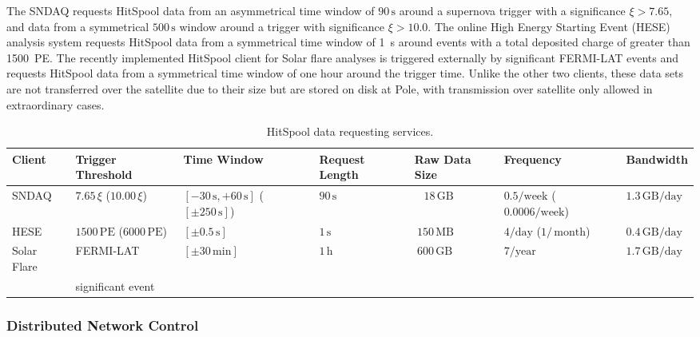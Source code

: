The SNDAQ requests HitSpool data from an asymmetrical
time window of $90 \,\mathrm{s}$ around a
supernova trigger with a significance $\xi > 7.65$, and
data from a symmetrical
$500\,\mathrm{s}$ window around a trigger with significance $\xi
> 10.0$. The online High Energy Starting Event
(HESE) analysis system requests HitSpool data from a
symmetrical time window of 1~s around events with a total deposited
charge of greater than 1500~PE.
The recently implemented HitSpool client for Solar flare analyses is
triggered externally by significant FERMI-LAT events and requests
HitSpool data from a
symmetrical time window of one hour around the trigger
time. Unlike the other two clients, these data sets
are not transferred over the satellite due to their size but are stored on
disk at Pole, with transmission over satellite only allowed in
extraordinary cases.


\begin{table}
  \caption{HitSpool data requesting services.} 
    \centering
  \footnotesize
\begin{tabularx}{\textwidth}{XXXXXXX}
  \toprule
  Client &  Trigger Threshold & Time Window & Request Length & Raw Data Size & Frequency & Bandwidth \\
  \midrule
  SNDAQ & $7.65 \,\xi$ ($10.00 \,\xi$) & $[-30\,\mathrm{s},+60\,\mathrm{s}]$  ($[\pm250 \,\mathrm{s}]$)& $90 \,\mathrm{s}$& ~ $18 \,\mathrm{GB}$& $0.5/\mathrm{week}$ ($0.0006 / \mathrm{week}$)& $1.3 \,\mathrm{GB} / \mathrm{day}$\\
  HESE & $1500 \,\mathrm{PE} $  ($6000 \,\mathrm{PE} $) & $[\pm0.5\,\mathrm{s}]$& $1\,\mathrm{s}$  &  $~150\,\mathrm{MB}$ &  $4/\mathrm{day}$ ($1/\,\mathrm{month}$) & $0.4\,\mathrm{GB}/\mathrm{day}$  \\
  Solar Flare & FERMI-LAT & $[\pm30\,\mathrm{min}]$ & $1\,\mathrm{h}$&
  $~600\,\mathrm{GB}$& $ 7 / \mathrm{year}$& $ 1.7
  \,\mathrm{GB}/\mathrm{day}$\\
& significant event & & & & & \\
\bottomrule
\end{tabularx}
\label{tab:hsclients}
\end{table}

\subsubsection{Distributed Network Control}


